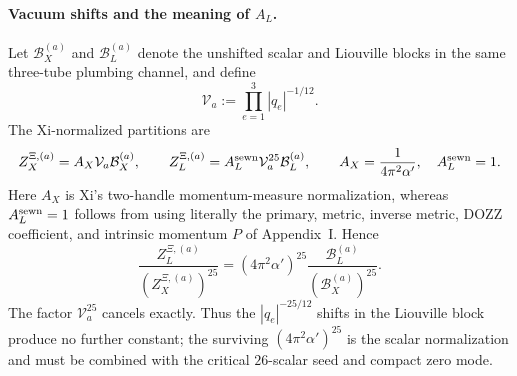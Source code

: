 \documentclass[11pt]{article}
\numberwithin{equation}{section}
\newcommand{\A}{\alpha'}
\newcommand{\cB}{\mathcal B}
\newcommand{\cV}{\mathcal V}
\begin{document}
\paragraph{Vacuum shifts and the meaning of $A_L$.}
Let $\cB_X^{(a)}$ and $\cB_L^{(a)}$ denote the unshifted scalar and
Liouville blocks in the same three-tube plumbing channel, and define
\begin{equation}
 \cV_a:=\prod_{e=1}^3|q_e|^{-1/12}.
\end{equation}
The Xi-normalized partitions are
\begin{equation}
 Z_X^{\Xi,(a)}=A_X\cV_a\cB_X^{(a)},
 \qquad
 Z_L^{\Xi,(a)}=A_L^{\rm sewn}\cV_a^{25}\cB_L^{(a)},
 \qquad
 A_X=\frac1{4\pi^2\A},
 \quad A_L^{\rm sewn}=1.
 \label{eq:AL-sewn-ledger}
\end{equation}
Here $A_X$ is Xi's two-handle momentum-measure normalization, whereas
$A_L^{\rm sewn}=1$ follows from using literally the primary, metric, inverse
metric, DOZZ coefficient, and intrinsic momentum $P$ of Appendix~I.  Hence
\begin{equation}
 \frac{Z_L^{\Xi,(a)}}{(Z_X^{\Xi,(a)})^{25}}
 =(4\pi^2\A)^{25}
 \frac{\cB_L^{(a)}}{(\cB_X^{(a)})^{25}}.
 \label{eq:q-shift-cancellation-quotient}
\end{equation}
The factor $\cV_a^{25}$ cancels exactly.  Thus the
$|q_e|^{-25/12}$ shifts in the Liouville block produce no further constant;
the surviving $(4\pi^2\A)^{25}$ is the scalar normalization and must be
combined with the critical $26$-scalar seed and compact zero mode.
\end{document}
